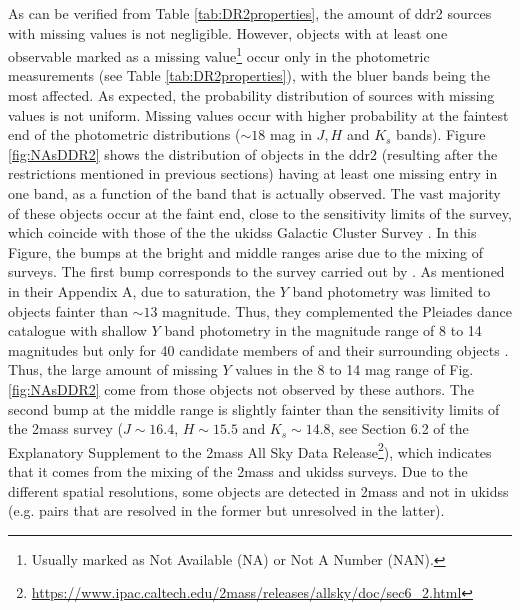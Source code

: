 As can be verified from Table \ref{tab:DR2properties}, the amount of \gls{ddr2} sources with missing values is not negligible.  
However, objects with at least one observable marked as a missing value\footnote{Usually marked as Not Available (NA) or Not A Number (NAN).} occur only in the photometric measurements (see Table \ref{tab:DR2properties}), with the bluer bands being the most affected. As expected, the probability distribution of sources with missing values is not uniform. Missing values occur with higher probability at the faintest end of the photometric distributions ($\sim 18$ mag in $J,H$ and $K_s$ bands). Figure \ref{fig:NAsDDR2} shows the distribution of objects in the \gls{ddr2} (resulting after the restrictions mentioned in previous sections) having at least one missing entry in one band, as a function of the band that is actually observed. The vast majority of these objects occur at the faint end, close to the sensitivity limits of the survey, which coincide with those of the the \gls{ukidss} Galactic Cluster Survey \cite[$Y\sim 20.3$, $J\sim19.5$, $H\sim K_s\sim18.6$ according to][ and shown in Figure \ref{fig:NAsDDR2} with vertical dotted lines]{2007MNRAS.379.1599L}. In this Figure, the bumps at the bright and middle ranges arise due to the mixing of surveys. The first bump corresponds to the survey carried out by \citet{Bouy2015}. As mentioned in their Appendix A, due to saturation, the $Y$ band photometry was limited to objects fainter than $\sim 13$ magnitude. Thus, they complemented the Pleiades \gls{dance} catalogue with shallow $Y$ band photometry in the magnitude range of 8 to 14 magnitudes but only for 40 candidate members of \citet{Stauffer2007} and their surrounding objects \cite[see][for more details]{Bouy2015}. Thus, the large amount of missing $Y$ values in the 8 to 14 mag range of Fig. \ref{fig:NAsDDR2} come from those objects not observed by these authors. The second bump at the middle range is slightly fainter than the sensitivity limits of the \gls{2mass} survey ($J\sim 16.4$, $H\sim15.5$ and $K_s \sim 14.8$, see Section 6.2 of the Explanatory Supplement to the \gls{2mass} All Sky Data Release\footnote{\url{https://www.ipac.caltech.edu/2mass/releases/allsky/doc/sec6_2.html}}), which indicates that it comes from the mixing of the \gls{2mass} and \gls{ukidss} surveys. Due to the different spatial resolutions, some objects are detected in \gls{2mass} and not in \gls{ukidss} (e.g. pairs that are resolved in the former but unresolved in the latter).

